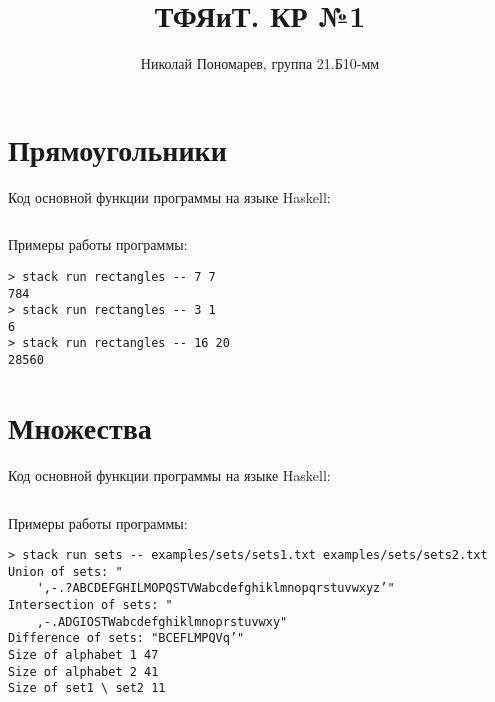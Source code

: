 \documentclass[12pt, oneside]{memoir}
\title{ТФЯиТ. КР №1}
\author{Николай Пономарев, группа 21.Б10-мм}
\begin{document}
\maketitle

\chapter{Прямоугольники}
Код основной функции программы на языке Haskell:
\inputminted[breaklines, firstline=12, lastline=19]{haskell}{../../app/rectangles/Main.hs}

Примеры работы программы:
\begin{verbatim}
> stack run rectangles -- 7 7
784
> stack run rectangles -- 3 1
6
> stack run rectangles -- 16 20
28560
\end{verbatim}

\chapter{Множества}
Код основной функции программы на языке Haskell:
\inputminted[breaklines, firstline=8, lastline=46]{haskell}{../../app/sets/Main.hs}

Примеры работы программы:
\begin{verbatim}
> stack run sets -- examples/sets/sets1.txt examples/sets/sets2.txt
Union of sets: "
    ',-.?ABCDEFGHILMOPQSTVWabcdefghiklmnopqrstuvwxyz’"
Intersection of sets: "
    ,-.ADGIOSTWabcdefghiklmnoprstuvwxy"
Difference of sets: "BCEFLMPQVq’"
Size of alphabet 1 47
Size of alphabet 2 41
Size of set1 \ set2 11
\end{verbatim}
\end{document}
